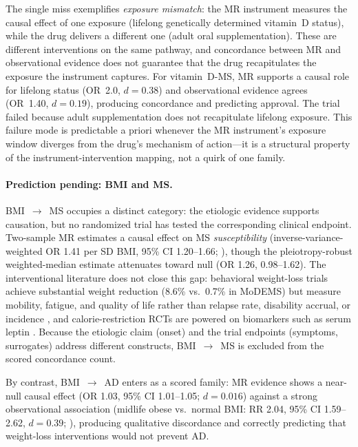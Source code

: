 \documentclass[11pt]{article}
\begin{document}
The single miss exemplifies \emph{exposure mismatch}: the MR instrument measures the causal effect of one exposure (lifelong genetically determined vitamin~D status), while the drug delivers a different one (adult oral supplementation). These are different interventions on the same pathway, and concordance between MR and observational evidence does not guarantee that the drug recapitulates the exposure the instrument captures. For vitamin~D-MS, MR supports a causal role for lifelong status (OR~2.0, $d = 0.38$) and observational evidence agrees (OR~1.40, $d = 0.19$), producing concordance and predicting approval. The trial failed because adult supplementation does not recapitulate lifelong exposure. This failure mode is predictable a priori whenever the MR instrument's exposure window diverges from the drug's mechanism of action---it is a structural property of the instrument-intervention mapping, not a quirk of one family.

\paragraph{Prediction pending: BMI and MS.}
BMI~$\to$~MS occupies a distinct category: the etiologic evidence supports causation, but no randomized trial has tested the corresponding clinical endpoint. Two-sample MR estimates a causal effect on MS \emph{susceptibility} (inverse-variance-weighted OR 1.41 per SD BMI, 95\% CI 1.20--1.66; \cite{mokry2016obesity}), though the pleiotropy-robust weighted-median estimate attenuates toward null (OR 1.26, 0.98--1.62). The interventional literature does not close this gap: behavioral weight-loss trials achieve substantial weight reduction (8.6\% vs.\ 0.7\% in MoDEMS) but measure mobility, fatigue, and quality of life rather than relapse rate, disability accrual, or incidence \cite{bruce2023modems}, and calorie-restriction RCTs are powered on biomarkers such as serum leptin \cite{ghezzi2025icr}. Because the etiologic claim (onset) and the trial endpoints (symptoms, surrogates) address different constructs, BMI~$\to$~MS is excluded from the scored concordance count.

By contrast, BMI~$\to$~AD enters as a scored family: MR evidence shows a near-null causal effect (OR 1.03, 95\% CI 1.01--1.05; $d = 0.016$) against a strong observational association (midlife obese vs.\ normal BMI: RR 2.04, 95\% CI 1.59--2.62, $d = 0.39$; \cite{anstey2011}), producing qualitative discordance and correctly predicting that weight-loss interventions would not prevent AD.
\end{document}
